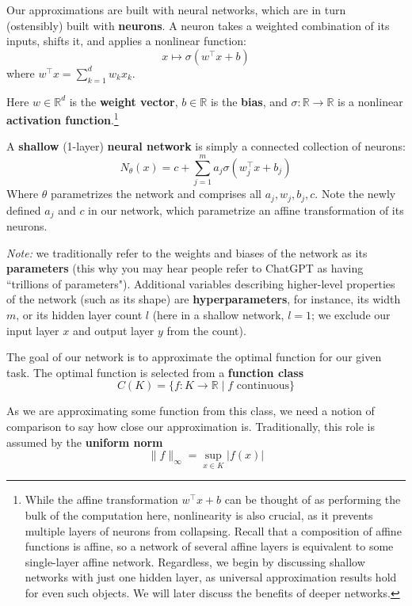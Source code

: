 \documentclass{article}
\theoremstyle{definition}
\newcommand{\note}{\textit{Note: }}
\begin{document}

Our approximations are built with neural networks, which are in turn (ostensibly) built with \textbf{neurons}. A neuron takes a weighted combination of its inputs, shifts it, and applies a nonlinear function:
$$x \mapsto \sigma(w^\top x + b)$$
where $w^\top x = \sum^{d}_{k=1}w_kx_k$.

Here $w \in \mathbb{R}^d$ is the \textbf{weight vector}, $b \in \mathbb{R}$ is the \textbf{bias}, and $\sigma : \mathbb{R} \to \mathbb{R}$ is a nonlinear \textbf{activation function}.\footnote{
While the affine transformation $w^\top x + b$ can be thought of as performing the bulk of the computation here, nonlinearity is also crucial, as it prevents multiple layers of neurons from collapsing. Recall that a composition of affine functions is affine, so a network of several affine layers is equivalent to some single-layer affine network. Regardless, we begin by discussing shallow networks with just one hidden layer, as universal approximation results hold for even such objects. We will later discuss the benefits of deeper networks.}

A \textbf{shallow} (1-layer) \textbf{neural network} is simply a connected collection of neurons:
$$N_\theta(x) = c + \sum^{m}_{j=1} a_j \sigma(w^\top_jx + b_j)$$
Where $\theta$ parametrizes the network and comprises all $a_j, w_j, b_j, c$. Note the newly defined $a_j$ and $c$ in our network, which parametrize an affine transformation of its neurons.

\begin{aside}
\note we traditionally refer to the weights and biases of the network as its \textbf{parameters} (this why you may hear people refer to ChatGPT as having ``trillions of parameters"). Additional variables describing higher-level properties of the network (such as its shape) are \textbf{hyperparameters}, for instance, its width $m$, or its hidden layer count $l$ (here in a shallow network, $l=1$; we exclude our input layer $x$ and output layer $y$ from the count).
\end{aside}

The goal of our network is to approximate the optimal function for our given task. The optimal function is selected from a \textbf{function class}
$$C(K) = \{f: K \to \mathbb{R} \mid f \text{\ continuous}\}$$

As we are approximating some function from this class, we need a notion of comparison to say how close our approximation is. Traditionally, this role is assumed by the \textbf{uniform norm}
$$\|f\|_\infty = \sup_{x \in K}|f(x)|$$
\end{document}
